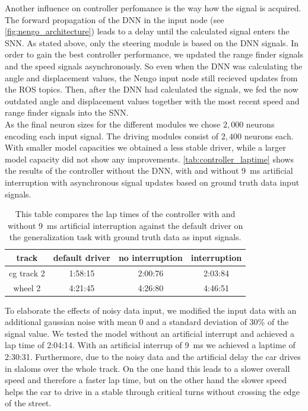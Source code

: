 \documentclass[10pt,a4paper,twoside,journal]{IEEEtran}
\begin{document}
Another influence on controller perfomance is the way how the signal is acquired. The forward propagation of the DNN in the input node (see \autoref{fig:nengo_architecture}) leads to a delay until the calculated signal enters the SNN. As stated above, only the steering module is based on the DNN signals. In order to gain the best controller performance, we updated the range finder signals and the speed signals asynchronously. So even when the DNN was calculating the angle and displacement values, the Nengo input node still recieved updates from the ROS topics. Then, after the DNN had calculated the signals, we fed the now outdated angle and displacement values together with the most recent speed and range finder signals into the SNN. \\
As the final neuron sizes for the different modules we chose $2,000$ neurons encoding each input signal. The driving modules consist of $2,400$ neurons each. With smaller model capacities we obtained a less stable driver, while a larger model capacity did not show any improvements. \autoref{tab:controller_laptime} shows the results of the controller without the DNN, with and without \SI{9}{\milli\second} artificial interruption with asynchronous signal updates based on ground truth data input signals. \\
\begin{table}[ht]
	\begin{center}
		\begin{tabular}{ |c|c|c|c| } 
			\hline
			track &  default driver & no interruption & interruption \\
			\hline
			cg track 2  & 1:58:15 & 2:00:76 & 2:03:84  \\
			wheel 2 & 4:21:45 & 4:26:80 & 4:46:51 \\
			\hline
		\end{tabular}
		\caption{\label{tab:controller_laptime}This table compares the lap times of the controller with and without \SI{9}{\milli\second} artificial interruption against the default driver on the generalization task with ground truth data as input signals.}
	\end{center}
\end{table}
To elaborate the effects of noisy data input, we modified the input data with an additional gaussian noise with mean 0 and a standard deviation of 30\% of the signal value. We tested the model without an artificial interrupt and achieved a lap time of 2:04:14. With an artificial interrup of \SI{9}{\milli\second} we achieved a laptime of 2:30:31. Furthermore, due to the noisy data and the artificial delay the car drives in slaloms over the whole track. On the one hand this leads to a slower overall speed and therefore a faster lap time, but on the other hand the slower speed helps the car to drive in a stable through critical turns without crossing the edge of the street.
\end{document}
